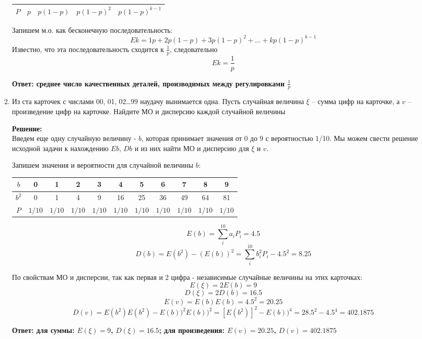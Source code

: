 \documentclass[a4paper,12pt]{article}
\begin{document}
\begin{enumerate}
\begin{center}
\begin{tabular}{|c| c| c| c|c|}
 \hline
$P$ & $p$ & $p(1-p)$ & $p(1-p)^2$ & $p(1-p)^{k-1}$\\ 
\hline
\end{tabular}
\end{center}

Запишем м.о. как бесконечную последовательность:
$$Ek = 1p+2p(1-p)+3p(1-p)^2+...+kp(1-p)^{k-1}$$
Известно, что эта последовательность сходится к $\frac{1}{p}$, следовательно
$$Ek=\frac{1}{p}$$

\textbf{Ответ: среднее число качественных деталей, производимых между регулировками $\frac{1}{p}$}


\item Из ста карточек с числами 00, 01, 02…99 наудачу вынимается одна. Пусть случайная величина $\xi$ – сумма цифр на карточке, а $v$ – произведение цифр на карточке. Найдите МО и дисперсию каждой случайной величины

\textbf{Решение:}\\

Введем еще одну случайную величину - $b$, которая принимает значения от 0 до 9 с вероятностью 1/10. Мы можем свести решение исходной задачи к нахождению $Eb$, $Db$ и из них найти МО и дисперсию для $\xi$ и $v$.

Запишем значения и вероятности для случайной величины $b$:
\begin{center}
 \begin{tabular}{|c| c| c| c|c|c|c|c|c|c|c|} 
 \hline
 $b$ & 0&1 & 2 & 3 & 4&5&6&7&8&9\\ 
  \hline

 $b^2$ & 0&1 & 4 & 9 & 16&25&36&49&64&81\\ 

 \hline
$P$ & $1/10$ & $1/10$& $1/10$& $1/10$& $1/10$& $1/10$& $1/10$& $1/10$& $1/10$& $1/10$\\ 
\hline
\end{tabular}
\end{center}

$$E(b)=\sum_i^{10} {a_i P_i} = 4.5$$
$$D(b)=E(b^2) - (E(b))^2=\sum_i^{10} {b^2_i P_i}-4.5^2 = 8.25$$

По свойствам МО и дисперсии, так как первая и 2 цифра - независимые случайные величины на этих карточках:
$$E(\xi) =2E(b)= 9$$
$$D(\xi) =2D(b)= 16.5$$
$$E(v) =E(b) E(b)= 4.5^2=20.25$$
$$D(v)=E(b^2) E(b^2) - E(b))^2 E(b))^2= [E(b^2)]^2-E(b))^4 = 28.5^2-4.5^4=402.1875$$


\textbf{Ответ: для суммы: $E(\xi) = 9$, $D(\xi) = 16.5$; для произведения: $E(v) =20.25$, $D(v)=402.1875$ }



\end{enumerate}
\end{document}
